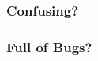 \documentclass{beamer}
\begin{document}
% 

{
\begin{frame}[plain]
\frametitle{Confusing?}
\end{frame}
}

{
\begin{frame}[plain]
\frametitle{Full of Bugs?}
\end{frame}
}
\end{document}
